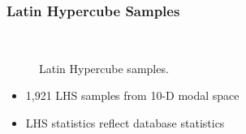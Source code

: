 \documentclass[9pt]{beamer}
\begin{document}
\begin{frame}
\frametitle{Latin Hypercube Samples}
\label{sec-3-11}

\vspace*{-0.0cm}\begin{figure}
      \vspace*{-1.5cm} \\
      \vspace*{-0.5cm}
      \vspace*{-0.5cm}
      \caption{Latin Hypercube samples.}
\end{figure}
\begin{itemize}
\item 1,921 LHS samples from 10-D modal space
\item LHS statistics reflect database statistics
\end{itemize}
\end{frame}
\end{document}
